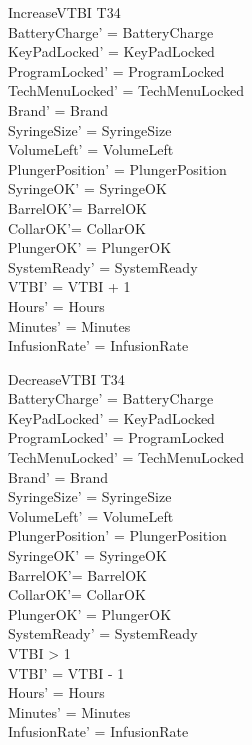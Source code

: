 \documentclass[landscape]{article}
\begin{document}
\begin{schema} {IncreaseVTBI}
\Delta T34\\
\where
BatteryCharge' =  BatteryCharge \\
KeyPadLocked' = KeyPadLocked\\
ProgramLocked' = ProgramLocked \\
TechMenuLocked' = TechMenuLocked\\
Brand' = Brand\\ 
SyringeSize' = SyringeSize\\
VolumeLeft' = VolumeLeft\\
PlungerPosition' = PlungerPosition \\
SyringeOK' = SyringeOK\\
BarrelOK'= BarrelOK\\
CollarOK'= CollarOK\\
PlungerOK' = PlungerOK \\
SystemReady' = SystemReady\\
VTBI' = VTBI + 1 \\ 
Hours' = Hours\\
Minutes' = Minutes\\
InfusionRate' = InfusionRate\\
\end{schema}

\begin{schema} {DecreaseVTBI}
\Delta T34\\
\where
BatteryCharge' =  BatteryCharge \\
KeyPadLocked' = KeyPadLocked\\
ProgramLocked' = ProgramLocked \\
TechMenuLocked' = TechMenuLocked\\
Brand' = Brand\\ 
SyringeSize' = SyringeSize\\
VolumeLeft' = VolumeLeft\\
PlungerPosition' = PlungerPosition \\
SyringeOK' = SyringeOK\\
BarrelOK'= BarrelOK\\
CollarOK'= CollarOK\\
PlungerOK' = PlungerOK \\
SystemReady' = SystemReady\\
VTBI > 1\\
VTBI' = VTBI - 1\\
Hours' = Hours\\
Minutes' = Minutes\\
InfusionRate' = InfusionRate\\
\end{schema}
\end{document}
